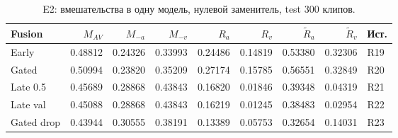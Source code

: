 \begin{table}[H]\centering\scriptsize
\setlength{\tabcolsep}{4pt}
\caption{E2: вмешательства в одну модель, нулевой заменитель, test 300 клипов.}\label{tab:missing}
\begin{tabular}{lrrrrrrrl}
\toprule
Fusion & $M_{AV}$ & $M_{-a}$ & $M_{-v}$ & $R_a$ & $R_v$ & $\tilde R_a$ & $\tilde R_v$ & Ист. \\
\midrule
Early & 0.48812 & 0.24326 & 0.33993 & 0.24486 & 0.14819 & 0.53380 & 0.32306 & R19 \\
Gated & 0.50994 & 0.23820 & 0.35209 & 0.27174 & 0.15785 & 0.56551 & 0.32849 & R20 \\
Late 0.5 & 0.45689 & 0.28868 & 0.43843 & 0.16820 & 0.01846 & 0.39348 & 0.04319 & R21 \\
Late val & 0.45088 & 0.28868 & 0.43843 & 0.16219 & 0.01245 & 0.38483 & 0.02954 & R22 \\
Gated drop & 0.43944 & 0.30555 & 0.38191 & 0.13389 & 0.05753 & 0.32654 & 0.14031 & R23 \\
\bottomrule
\end{tabular}
\end{table}

